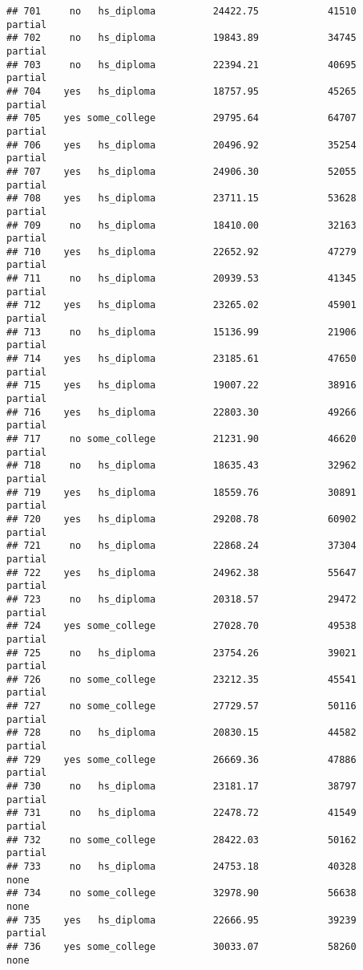\documentclass[
]{article}
\begin{document}
\begin{verbatim}
## 701     no   hs_diploma          24422.75            41510     partial
## 702     no   hs_diploma          19843.89            34745     partial
## 703     no   hs_diploma          22394.21            40695     partial
## 704    yes   hs_diploma          18757.95            45265     partial
## 705    yes some_college          29795.64            64707     partial
## 706    yes   hs_diploma          20496.92            35254     partial
## 707    yes   hs_diploma          24906.30            52055     partial
## 708    yes   hs_diploma          23711.15            53628     partial
## 709     no   hs_diploma          18410.00            32163     partial
## 710    yes   hs_diploma          22652.92            47279     partial
## 711     no   hs_diploma          20939.53            41345     partial
## 712    yes   hs_diploma          23265.02            45901     partial
## 713     no   hs_diploma          15136.99            21906     partial
## 714    yes   hs_diploma          23185.61            47650     partial
## 715    yes   hs_diploma          19007.22            38916     partial
## 716    yes   hs_diploma          22803.30            49266     partial
## 717     no some_college          21231.90            46620     partial
## 718     no   hs_diploma          18635.43            32962     partial
## 719    yes   hs_diploma          18559.76            30891     partial
## 720    yes   hs_diploma          29208.78            60902     partial
## 721     no   hs_diploma          22868.24            37304     partial
## 722    yes   hs_diploma          24962.38            55647     partial
## 723     no   hs_diploma          20318.57            29472     partial
## 724    yes some_college          27028.70            49538     partial
## 725     no   hs_diploma          23754.26            39021     partial
## 726     no some_college          23212.35            45541     partial
## 727     no some_college          27729.57            50116     partial
## 728     no   hs_diploma          20830.15            44582     partial
## 729    yes some_college          26669.36            47886     partial
## 730     no   hs_diploma          23181.17            38797     partial
## 731     no   hs_diploma          22478.72            41549     partial
## 732     no some_college          28422.03            50162     partial
## 733     no   hs_diploma          24753.18            40328        none
## 734     no some_college          32978.90            56638        none
## 735    yes   hs_diploma          22666.95            39239     partial
## 736    yes some_college          30033.07            58260        none

\end{verbatim}
\end{document}
